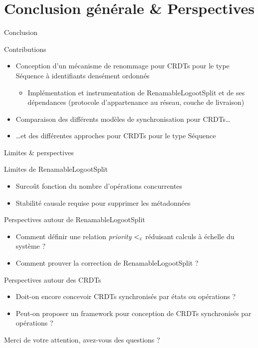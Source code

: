 \section{Conclusion générale \& Perspectives}

\begin{frame}{Conclusion}
  \begin{block}{Contributions}
    \begin{itemize}
      \item Conception d'un mécanisme de renommage pour CRDTs pour le type Séquence à identifiants densément ordonnés
      \begin{itemize}
        \item Implémentation et instrumentation de RenamableLogootSplit et de ses dépendances (protocole d'appartenance au réseau, couche de livraison)
      \end{itemize}
      \pause
      \item Comparaison des différents modèles de synchronisation pour CRDTs\dots
      \item \dots et des différentes approches pour CRDTs pour le type Séquence
    \end{itemize}
  \end{block}
\end{frame}

\begin{frame}{Limites \& perspectives}
  \begin{block}{Limites de RenamableLogootSplit}
    \begin{itemize}
      \item Surcoût fonction du nombre d'opérations \ren concurrentes
      \item Stabilité causale requise pour supprimer les métadonnées
    \end{itemize}
  \end{block}
  \begin{block}{Perspectives autour de RenamableLogootSplit}
    \begin{itemize}
      \item Comment définir une relation \emph{priority} $<_{\varepsilon}$ réduisant calculs à échelle du système ?
      \item Comment prouver la correction de RenamableLogootSplit ?
    \end{itemize}
  \end{block}
  \pause
  \begin{block}{Perspectives autour des CRDTs}
    \begin{itemize}
      \item Doit-on encore concevoir CRDTs synchronisés par états ou opérations ?
      \item Peut-on proposer un framework pour conception de CRDTs synchronisés par opérations ?
    \end{itemize}
  \end{block}
\end{frame}

\begin{frame}[standout]
  Merci de votre attention, avez-vous des questions ?
  \vspace{3em}
  \begin{center}
    \ccby
  \end{center}
\end{frame}
